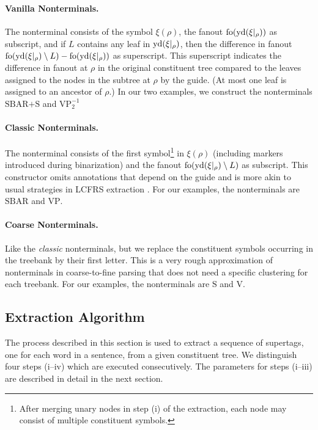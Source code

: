 \documentclass[../document.tex]{subfiles}
\begin{document}
    \paragraph{Vanilla Nonterminals.}
    The nonterminal consists of the symbol \(\xi(\rho)\), the fanout \(\operatorname{fo}(\operatorname{yd}(\xi|_\rho))\) as subscript, and if \(L\) contains any leaf in \(\operatorname{yd}(\xi|_\rho)\), then the difference in fanout \(\operatorname{fo}(\operatorname{yd}(\xi|_\rho) \setminus L) - \operatorname{fo}(\operatorname{yd}(\xi|_\rho))\) as superscript.
    This superscript indicates the difference in fanout at \(\rho\) in the original constituent tree compared to the leaves assigned to the nodes in the subtree at \(\rho\) by the guide.
    (At most one leaf is assigned to an ancestor of \(\rho\).)
    In our two examples, we construct the nonterminals \(\text{SBAR+S}\) and \(\text{VP}_2^{-1}\)

    \paragraph{Classic Nonterminals.}
    The nonterminal consists of the first symbol\footnote{
           After merging unary nodes in step (i) of the extraction, each node may consist of multiple constituent symbols.}
    in \(\xi(\rho)\) (including markers introduced during binarization) and the fanout \(\operatorname{fo}(\operatorname{yd}(\xi|_\rho) \setminus L)\) as subscript.
    This constructor omits annotations that depend on the guide and is more akin to usual strategies in LCFRS extraction \cite{MaierSogaard08}.
    For our examples, the nonterminals are \(\text{SBAR}\) and \(\text{VP}\).

    \paragraph{Coarse Nonterminals.} Like the \emph{classic} nonterminals, but we replace the constituent symbols occurring in the treebank by their first letter.
    This is a very rough approximation of nonterminals in coarse-to-fine parsing \cite{Cha06} that does not need a specific clustering for each treebank.
    For our examples, the nonterminals are \(\text{S}\) and \(\text{V}\).

    \subsection{Extraction Algorithm}
    The process described in this section is used to extract a sequence of supertags, one for each word in a sentence, from a given constituent tree.
    We distinguish four steps (i--iv) which are executed consecutively.
    The parameters for steps (i--iii) are described in detail in the next section.
\end{document}
